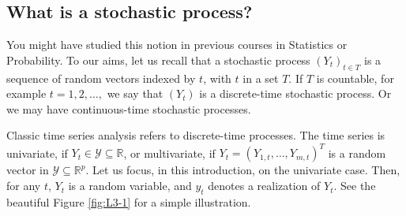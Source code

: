 \documentclass[dvipsnames,12pt]{book}
\begin{document}
            \subsection{What is a stochastic process?} 
            
                You might have studied this notion in previous courses in Statistics or Probability. To our aims, let us recall that a stochastic process $(Y_t)_{t \in T}$ is a sequence of random vectors indexed by $t$, with $t$ in a set $T$. If $T$ is countable, for example $t = 1, 2, \ldots,$ we say that $(Y_t)$ is a discrete-time stochastic process. Or we may have continuous-time stochastic processes. 
                
                Classic time series analysis refers to discrete-time processes. The time series is univariate, if $Y_t \in \mathcal{Y} \subseteq \mathbb{R}$, or multivariate, if $Y_t = (Y_{1,t}, \ldots, Y_{m,t})^T$ is a random vector in  $\mathcal{Y} \subseteq \mathbb{R}^p$. Let us focus, in this introduction,  on the univariate case. Then, for any $t$, $Y_t$ is a random variable,  and $y_t$ denotes a realization of $Y_t$. See the beautiful Figure \ref{fig:L3-1} for a simple illustration.
\end{document}
